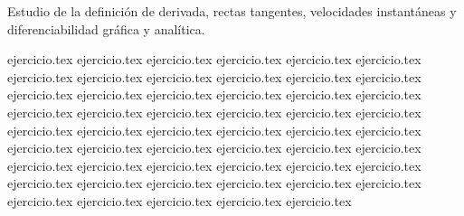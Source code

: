 
Estudio de la definición de derivada, rectas tangentes, velocidades instantáneas y diferenciabilidad gráfica y analítica.

\begin{enumerate}
    {ejercicio.tex}
    {ejercicio.tex}
    {ejercicio.tex}
    {ejercicio.tex}
    {ejercicio.tex}
    {ejercicio.tex}
    {ejercicio.tex}
    {ejercicio.tex}
    {ejercicio.tex}
    {ejercicio.tex}
    {ejercicio.tex}
    {ejercicio.tex}
    {ejercicio.tex}
    {ejercicio.tex}
    {ejercicio.tex}
    {ejercicio.tex}
    {ejercicio.tex}
    {ejercicio.tex}
    {ejercicio.tex}
    {ejercicio.tex}
    {ejercicio.tex}
    {ejercicio.tex}
    {ejercicio.tex}
    {ejercicio.tex}
    {ejercicio.tex}
    {ejercicio.tex}
    {ejercicio.tex}
    {ejercicio.tex}
    {ejercicio.tex}
    {ejercicio.tex}
    {ejercicio.tex}
    {ejercicio.tex}
    {ejercicio.tex}
    {ejercicio.tex}
    {ejercicio.tex}
    {ejercicio.tex}
    {ejercicio.tex}
    {ejercicio.tex}
    {ejercicio.tex}
    {ejercicio.tex}
    {ejercicio.tex}
    {ejercicio.tex}
    {ejercicio.tex}
    {ejercicio.tex}
    {ejercicio.tex}
    {ejercicio.tex}
    {ejercicio.tex}
    {ejercicio.tex}
    {ejercicio.tex}
    {ejercicio.tex}
    {ejercicio.tex}
    {ejercicio.tex}
    {ejercicio.tex}
\end{enumerate}
